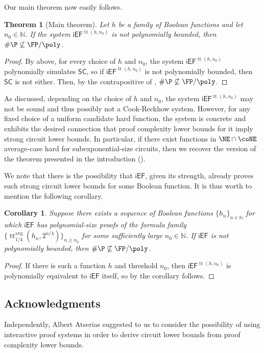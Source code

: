 \documentclass[11pt]{article}
\newcommand{\iEF}{\mathsf{iEF}}
\renewcommand{\SC}{\mathsf{SC}}
\theoremstyle{definition}
\theoremstyle{plain}
\newtheorem{theorem}[definition]{Theorem}
\newtheorem{corollary}[definition]{Corollary}
\theoremstyle{remark}
\DeclareMathOperator*{\ttt}{tt}
\newcommand{\ttable}{\ttt^{\operatorname{avg}}}
\newcommand{\bbN}{\mathbb{N}}
\begin{document}
Our main theorem now easily follows.


\begin{theorem}[Main theorem]
\label{thm:main-tech}
    Let $h$ be a family of Boolean functions and let $n_0 \in \bbN$. If the system $\iEF^{\operatorname{tt}(h, n_0)}$ is not polynomially bounded, then $\#\P \not\subseteq \FP/\poly$.
\end{theorem}


\begin{proof}
    By  above, for every choice of $h$ and $n_0$, the system $\iEF^{\operatorname{tt}(h, n_0)}$ polynomially simulates $\SC$, so if $\iEF^{\operatorname{tt}(h, n_0)}$ is not polynomially bounded, then $\SC$ is not either. Then, by the contrapositive of , $\#\P \not\subseteq \FP/\poly$.
\end{proof}

As discussed, depending on the choice of $h$ and $n_0$, the system $\iEF^{\operatorname{tt}(h, n_0)}$ may not be sound and thus possibly not a Cook-Reckhow system. However, for any fixed choice of a uniform candidate hard function, the system is concrete and exhibits the desired connection that proof complexity lower bounds for it imply strong circuit lower bounds. In particular, if there exist functions in $\NE \cap \coNE$ average-case hard for subexponential-size circuits, then we recover the version of the theorem presented in the introduction ().

We note that there is the possibility that $\iEF$, given its strength, already proves such strong circuit lower bounds for some Boolean function.  It is thus worth to mention the following corollary.

\begin{corollary}
    Suppose there exists a sequence of Boolean functions $\{h_n\}_{n\in\mathbb{N}}$ for which $\iEF$ has polynomial-size proofs of the formula family $\{\ttable_{1/4}(h_n, 2^{n/4})\}_{n\geq n_0}$ for some sufficiently large $n_0 \in \bbN$. If $\iEF$ is not polynomially bounded, then $\#\P \not\subseteq \FP/\poly$.
\end{corollary}

\begin{proof}
    If there is such a function $h$ and threshold $n_0$, then $\iEF^{\operatorname{tt}(h, n_0)}$ is polynomially equivalent to $\iEF$ itself, so by  the corollary follows.
\end{proof}

\subsection*{Acknowledgments}
Independently, Albert Atserias suggested to us to consider the possibility of using interactive proof systems in order to derive circuit lower bounds from proof complexity lower bounds.
\end{document}
